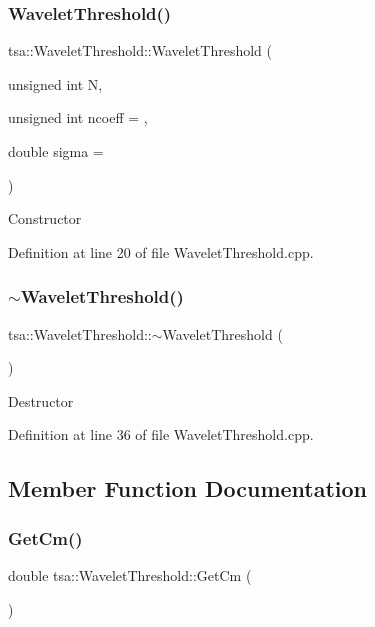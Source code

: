 \subsubsection{\texorpdfstring{Wavelet\+Threshold()}{WaveletThreshold()}}
{\footnotesize\ttfamily tsa\+::\+Wavelet\+Threshold\+::\+Wavelet\+Threshold (\begin{DoxyParamCaption}\item[{unsigned int}]{N,  }\item[{unsigned int}]{ncoeff = {},  }\item[{double}]{sigma = {} }\end{DoxyParamCaption})}

Constructor 

Definition at line 20 of file Wavelet\+Threshold.\+cpp.

\mbox{\label{classtsa_1_1_wavelet_threshold_a7a3219da0f0f814157c7a7c3d41a17cc}} 
\subsubsection{\texorpdfstring{$\sim$\+Wavelet\+Threshold()}{~WaveletThreshold()}}
{\footnotesize\ttfamily tsa\+::\+Wavelet\+Threshold\+::$\sim$\+Wavelet\+Threshold (\begin{DoxyParamCaption}{ }\end{DoxyParamCaption})}

Destructor 

Definition at line 36 of file Wavelet\+Threshold.\+cpp.



\subsection{Member Function Documentation}
\mbox{\label{classtsa_1_1_wavelet_threshold_aa2a36e1131551abc41b02c4e6a4352c7}} 
\subsubsection{\texorpdfstring{Get\+Cm()}{GetCm()}}
{\footnotesize\ttfamily double tsa\+::\+Wavelet\+Threshold\+::\+Get\+Cm (\begin{DoxyParamCaption}{ }\end{DoxyParamCaption})\hspace{0.3cm}{\ttfamily [inline]}}




